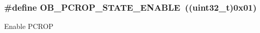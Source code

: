 \subsubsection[{\texorpdfstring{O\+B\+\_\+\+P\+C\+R\+O\+P\+\_\+\+S\+T\+A\+T\+E\+\_\+\+E\+N\+A\+B\+LE}{OB_PCROP_STATE_ENABLE}}]{\setlength{\rightskip}{0pt plus 5cm}\#define O\+B\+\_\+\+P\+C\+R\+O\+P\+\_\+\+S\+T\+A\+T\+E\+\_\+\+E\+N\+A\+B\+LE~((uint32\+\_\+t)0x01)}\hypertarget{group___f_l_a_s_h_ex___p_c_r_o_p___state_ga585627ceedceee7da01da4d3ca753108}{}\label{group___f_l_a_s_h_ex___p_c_r_o_p___state_ga585627ceedceee7da01da4d3ca753108}
Enable P\+C\+R\+OP 